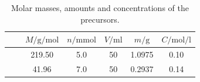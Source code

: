 \documentclass[draft,webedition,openright,titles,swedish,english]{LuaUUThesis}\usepackage[]{graphicx}\usepackage[]{xcolor}
\begin{document}
%

\begin{table}[tbp]
\centering
\caption{Molar masses, amounts and concentrations of the precursors.}
\label{tab:0204-precursors-QD}
\small
\begin{tabular}{l@{\;}lS[table-format=3.2]S[table-format=1.1]S[table-format=2.0]S[table-format=1.4]S[table-format=1.2]}\toprule
& & {$M/\unit{\g\per\mol}$} & {$n/\unit{\milli\mol}$} & {$V/\unit{\milli\litre}$} & {$m/\unit{\g}$} & {$C/\unit{\mol\per\litre}$} \\%
\midrule
{} &  & 219.50 & 5.0 & 50 & 1.0975 & 0.10 \\
 &  & 41.96  & 7.0 & 50 & 0.2937 & 0.14 \\
\bottomrule
\end{tabular}
\end{table}

%
\end{document}
